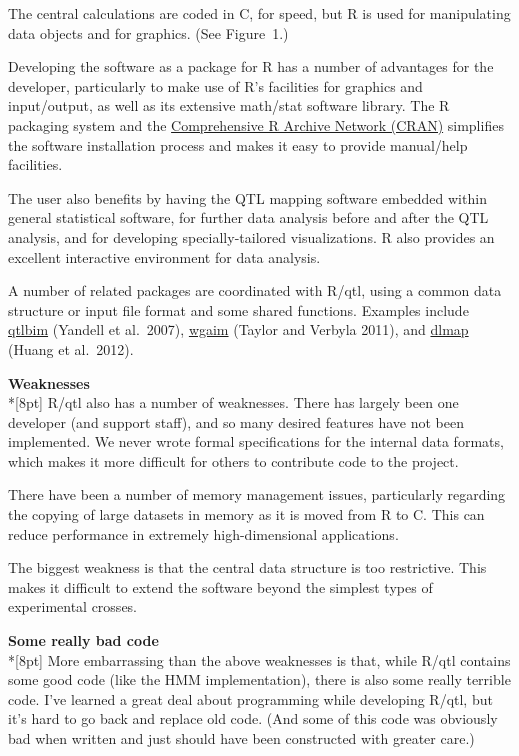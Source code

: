 \documentclass[letterpaper]{article}
\begin{document}
\begin{multicols}{2}
The central calculations are coded in C, for speed, but R is used for
manipulating data objects and for graphics. (See Figure~1.)

Developing the software as a package for R has a number of advantages
for the developer, particularly to make use of R's facilities for
graphics and input/output, as well as its extensive math/stat software
library. The R packaging system and the
\href{http://cran.r-project.org}{Comprehensive R Archive Network (CRAN)}
simplifies the software installation process and makes it easy to
provide manual/help facilities.

The user also benefits by having the QTL mapping software embedded
within general statistical software, for further data analysis before
and after the QTL analysis, and for developing specially-tailored
visualizations. R also provides an excellent interactive environment
for data analysis.

A number of related packages are coordinated with R/qtl, using a
common data structure or input file format and some shared functions.
Examples include \href{http://www.ssg.uab.edu/qtlbim/}{qtlbim}
(Yandell et al.\ 2007),
\href{http://cran.r-project.org/web/packages/wgaim/index.html}{wgaim}
(Taylor and Verbyla 2011),
and \href{http://cran.r-project.org/web/packages/dlmap/}{dlmap} (Huang
et al.\ 2012).


\bigskip
{}
\noindent \textbf{\sffamily Weaknesses}\\*[8pt]
R/qtl also has a number of weaknesses. There has largely been one
developer (and support staff), and so many desired features have not
been implemented. We never wrote formal specifications for the
internal data formats, which makes it more difficult for others to
contribute code to the project.

There have been a number of memory management issues, particularly
regarding the copying of large datasets in memory as it is moved from
R to C. This can reduce performance in extremely high-dimensional
applications.

The biggest weakness is that the central data structure is too
restrictive. This makes it difficult to extend the software beyond
the simplest types of experimental crosses.


\bigskip
{}
\noindent \textbf{\sffamily Some really bad code}\\*[8pt]
More embarrassing than the above weaknesses is that, while R/qtl
contains some good code (like the HMM implementation), there is also
some really terrible code. I've learned a great deal about programming
while developing R/qtl, but it's hard to go back and replace old code.
(And some of this code was obviously bad when written and just should
have been constructed with greater care.)


\end{multicols}
\end{document}
